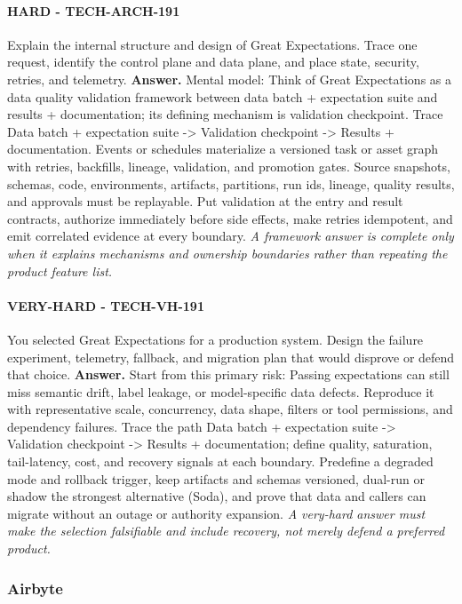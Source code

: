 \paragraph{HARD - TECH-ARCH-191} Explain the internal structure and design of Great Expectations. Trace one request, identify the control plane and data plane, and place state, security, retries, and telemetry.
\textbf{Answer.} Mental model: Think of Great Expectations as a data quality validation framework between data batch + expectation suite and results + documentation; its defining mechanism is validation checkpoint. Trace Data batch + expectation suite -> Validation checkpoint -> Results + documentation. Events or schedules materialize a versioned task or asset graph with retries, backfills, lineage, validation, and promotion gates. Source snapshots, schemas, code, environments, artifacts, partitions, run ids, lineage, quality results, and approvals must be replayable. Put validation at the entry and result contracts, authorize immediately before side effects, make retries idempotent, and emit correlated evidence at every boundary.
\textit{A framework answer is complete only when it explains mechanisms and ownership boundaries rather than repeating the product feature list.}
\paragraph{VERY-HARD - TECH-VH-191} You selected Great Expectations for a production system. Design the failure experiment, telemetry, fallback, and migration plan that would disprove or defend that choice.
\textbf{Answer.} Start from this primary risk: Passing expectations can still miss semantic drift, label leakage, or model-specific data defects. Reproduce it with representative scale, concurrency, data shape, filters or tool permissions, and dependency failures. Trace the path Data batch + expectation suite -> Validation checkpoint -> Results + documentation; define quality, saturation, tail-latency, cost, and recovery signals at each boundary. Predefine a degraded mode and rollback trigger, keep artifacts and schemas versioned, dual-run or shadow the strongest alternative (Soda), and prove that data and callers can migrate without an outage or authority expansion.
\textit{A very-hard answer must make the selection falsifiable and include recovery, not merely defend a preferred product.}
\subsubsection*{Airbyte}
